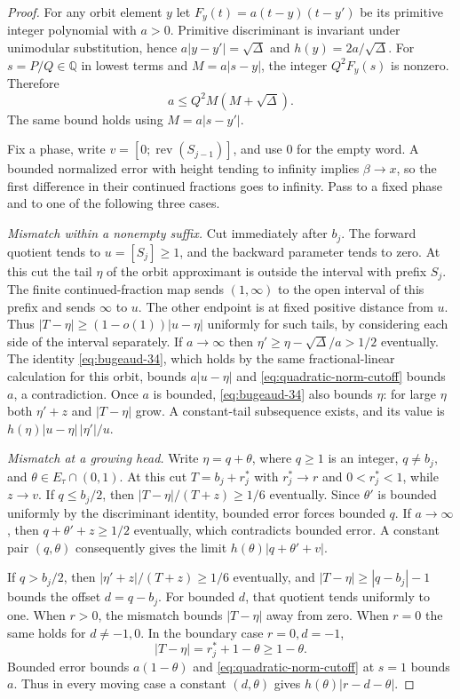 \documentclass[11pt]{amsart}
\theoremstyle{definition}
\theoremstyle{remark}
\numberwithin{equation}{section}
\newcommand{\Q}{\mathbb{Q}}
\begin{document}
\begin{proof}
For any orbit element $y$ let $F_y(t)=a(t-y)(t-y')$ be its primitive
integer polynomial with $a>0$. Primitive discriminant is invariant
under unimodular substitution, hence $a|y-y'|=\sqrt\Delta$ and
$h(y)=2a/\sqrt\Delta$. For $s=P/Q\in\Q$ in lowest terms and
$M=a|s-y|$, the integer $Q^2 F_y(s)$ is nonzero. Therefore
\begin{equation}\label{eq:quadratic-norm-cutoff}
  a\le Q^2 M(M+\sqrt\Delta).
\end{equation}
The same bound holds using $M=a|s-y'|$.

Fix a phase, write $v=[0;\operatorname{rev}(S_{j-1})]$, and use $0$
for the empty word. A bounded normalized error with height tending
to infinity implies $\beta\to x$, so the first difference in their
continued fractions goes to infinity. Pass to a fixed phase and to
one of the following three cases.

\emph{Mismatch within a nonempty suffix.}
Cut immediately after $b_j$. The forward quotient tends to
$u=[S_j]\ge1$, and the backward parameter tends to zero. At this cut the
tail $\eta$ of the orbit approximant is outside the interval with
prefix $S_j$. The finite continued-fraction map sends $(1,\infty)$ to
the open interval of this prefix and sends $\infty$ to $u$.
The other endpoint is at fixed positive distance from $u$.
Thus $|T-\eta|\ge(1-o(1))|u-\eta|$ uniformly for such tails, by considering
each side of the interval separately. If $a\to\infty$ then
$\eta'\ge\eta-\sqrt\Delta/a>1/2$ eventually. The identity
\eqref{eq:bugeaud-34}, which holds by the same fractional-linear
calculation for this orbit, bounds $a|u-\eta|$ and
\eqref{eq:quadratic-norm-cutoff} bounds $a$, a contradiction.
Once $a$ is bounded, \eqref{eq:bugeaud-34} also bounds $\eta$: for large $\eta$
both $\eta'+z$ and $|T-\eta|$ grow. A constant-tail subsequence
exists, and its value is $h(\eta)|u-\eta|\,|\eta'|/u$.

\emph{Mismatch at a growing head.}
Write $\eta=q+\theta$, where $q\ge1$ is an integer, $q\ne b_j$,
and $\theta\in E_\tau\cap(0,1)$. At this cut $T=b_j+r_j^*$ with
$r_j^*\to r$ and $0<r_j^*<1$, while $z\to v$.
If $q\le b_j/2$, then $|T-\eta|/(T+z)\ge1/6$ eventually.
Since $\theta'$ is bounded uniformly by the discriminant identity,
bounded error forces bounded $q$. If $a\to\infty$, then
$q+\theta'+z\ge1/2$ eventually, which contradicts bounded error.
A constant pair $(q,\theta)$ consequently gives the limit
$h(\theta)|q+\theta'+v|$.

If $q>b_j/2$, then $|\eta'+z|/(T+z)\ge1/6$ eventually, and
$|T-\eta|\ge|q-b_j|-1$ bounds the offset $d=q-b_j$.
For bounded $d$, that quotient tends uniformly to one. When $r>0$,
the mismatch bounds $|T-\eta|$ away from zero. When $r=0$ the same
holds for $d\ne-1,0$. In the boundary case $r=0,d=-1$,
\[
 |T-\eta|=r_j^*+1-\theta\ge 1-\theta.
\]
Bounded error bounds $a(1-\theta)$ and
\eqref{eq:quadratic-norm-cutoff} at $s=1$ bounds $a$.
Thus in every moving case a constant $(d,\theta)$ gives
$h(\theta)|r-d-\theta|$.


\end{proof}
\end{document}
